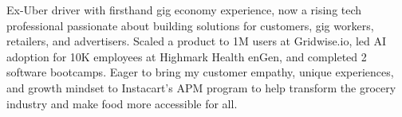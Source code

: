 
{




    Ex-Uber driver with firsthand gig economy experience, now a rising tech professional passionate about building solutions for customers, gig workers, retailers, and advertisers. Scaled a product to 1M users at Gridwise.io, led AI adoption for 10K employees at Highmark Health enGen, and completed 2 software bootcamps. Eager to bring my customer empathy, unique experiences, and growth mindset to Instacart’s APM program to help transform the grocery industry and make food more accessible for all.
}